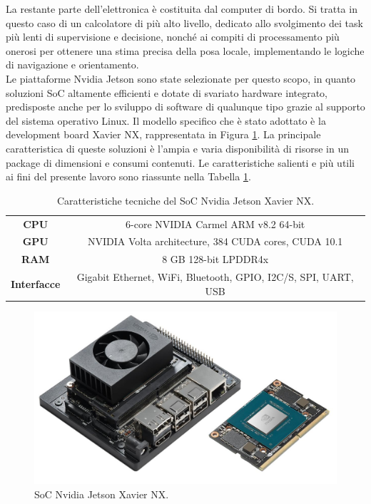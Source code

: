 \indent La restante parte dell'elettronica è costituita dal computer di bordo. Si tratta in questo caso di un calcolatore di più alto livello, dedicato allo svolgimento dei task più lenti di supervisione e decisione, nonché ai compiti di processamento più onerosi per ottenere una stima precisa della posa locale, implementando le logiche di navigazione e orientamento.\\
Le piattaforme Nvidia Jetson sono state selezionate per questo scopo, in quanto soluzioni SoC altamente efficienti e dotate di svariato hardware integrato, predisposte anche per lo sviluppo di software di qualunque tipo grazie al supporto del sistema operativo Linux. Il modello specifico che è stato adottato è la development board Xavier NX, rappresentata in Figura \ref{fig:nx}. La principale caratteristica di queste soluzioni è l'ampia e varia disponibilità di risorse in un package di dimensioni e consumi contenuti. Le caratteristiche salienti e più utili ai fini del presente lavoro sono riassunte nella Tabella \ref{tab:nx}.
\vspace{0.5cm}
\begin{table}[h]
    \centering
    \begin{tabular}{c|c}
        \textbf{CPU} & 6-core NVIDIA Carmel ARM v8.2 64-bit\\
        \textbf{GPU} & NVIDIA Volta architecture, 384 CUDA cores, CUDA 10.1\\
        \textbf{RAM} & 8 GB 128-bit LPDDR4x\\
        \textbf{Interfacce} & Gigabit Ethernet, WiFi, Bluetooth, GPIO, I2C/S, SPI, UART, USB
    \end{tabular}
    \caption{Caratteristiche tecniche del SoC Nvidia Jetson Xavier NX.}
    \label{tab:nx}
\end{table}

\begin{figure}
    \centering
    \includegraphics[scale=0.35]{figs/chapter3/nx.jpg}
    \caption{SoC Nvidia Jetson Xavier NX.}
    \label{fig:nx}
\end{figure}

